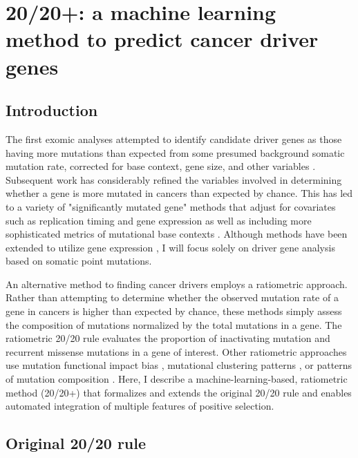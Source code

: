 
\chapter{20/20+: a machine learning method to predict cancer driver genes}
\label{chap:ch3}

\section{Introduction}

The first exomic analyses attempted to identify candidate driver genes as those having more mutations than expected from some presumed background somatic mutation rate, corrected for base context, gene size, and other variables \cite{RN78, RN4}. Subsequent work has considerably refined the variables involved in determining whether a gene is more mutated in cancers than expected by chance. This has led to a variety of "significantly mutated gene" methods that adjust for covariates such as replication timing and gene expression as well as including more sophisticated metrics of mutational base contexts \cite{RN13, RN43}. Although methods have been extended to utilize gene expression \cite{RN80, RN84, RN81, RN83, RN79, RN82}, I will focus solely on driver gene analysis based on somatic point mutations.

An alternative method to finding cancer drivers employs a ratiometric approach. Rather than attempting to determine whether the observed mutation rate of a gene in cancers is higher than expected by chance, these methods simply assess the composition of mutations normalized by the total mutations in a gene. The ratiometric 20/20 rule \cite{RN25} evaluates the proportion of inactivating mutation and recurrent missense mutations in a gene of interest. Other ratiometric approaches use mutation functional impact bias \cite{RN86, RN53}, mutational clustering patterns \cite{RN87, RN54, RN71}, or patterns of mutation composition \cite{RN71}. Here, I describe a machine-learning-based, ratiometric method (20/20+) that formalizes and extends the original 20/20 rule and enables automated integration of multiple features of positive selection.

\section{Original 20/20 rule}

